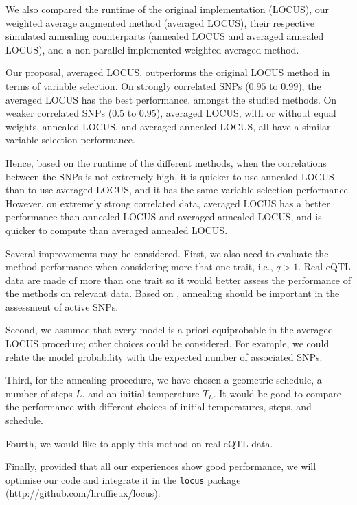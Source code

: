 \documentclass[a4paper, 11pt]{report}
\numberwithin{equation}{chapter}
\begin{document}
We also compared the runtime of the original implementation (LOCUS), our weighted average augmented method (averaged LOCUS), their respective simulated annealing counterparts (annealed LOCUS and averaged annealed LOCUS), and a non parallel implemented weighted averaged method.

Our proposal, averaged LOCUS, outperforms the original LOCUS method in terms of variable selection. On strongly correlated SNPs ($0.95$ to $0.99$), the averaged LOCUS has the best performance, amongst the studied methods. On weaker correlated SNPs ($0.5$ to $0.95$), averaged LOCUS, with or without equal weights, annealed LOCUS, and averaged annealed LOCUS, all have a similar variable selection performance.

Hence, based on the runtime of the different methods, when the correlations between the SNPs is not extremely high, it is quicker to use annealed LOCUS than to use averaged LOCUS, and it has the same variable selection performance. However, on extremely strong correlated data, averaged LOCUS has a better performance than annealed LOCUS and averaged annealed LOCUS, and is quicker to compute than averaged annealed LOCUS.

Several improvements may be considered. First, we also need to evaluate the method performance when considering more that one trait, i.e., $q > 1$. Real eQTL data are made of more than one trait so it would better assess the performance of the methods on relevant data. Based on \citet{glob_loc}, annealing should be important in the assessment of active SNPs.

Second, we assumed that every model is a priori equiprobable in the averaged LOCUS procedure; other choices could be considered. For example, we could relate the model probability with the expected number of associated SNPs.

Third, for the annealing procedure, we have chosen a geometric schedule, a number of steps $L$, and an initial temperature $T_L$. It would be good to compare the performance with different choices of initial temperatures, steps, and schedule.

Fourth, we would like to apply this method on real eQTL data.

Finally, provided that all our experiences show good performance, we will optimise our code and integrate it in the \texttt{locus} package (http://github.com/hruffieux/locus).
\newpage


\end{document}
